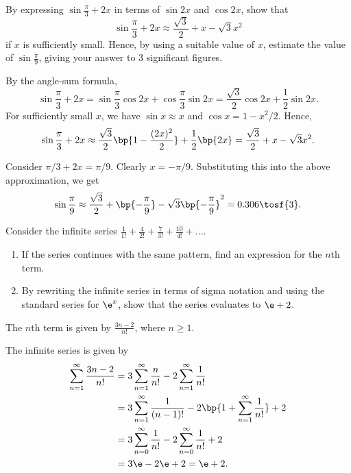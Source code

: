 \begin{problem}
    By expressing $\sin{\frac\pi3 + 2x}$ in terms of $\sin2x$ and $\cos2x$, show that \[\sin{\frac\pi3 + 2x} \approx \frac{\sqrt{3}}{2} + x - \sqrt{3}x^2\] if $x$ is sufficiently small. Hence, by using a suitable value of $x$, estimate the value of $\sin\frac{\pi}{9}$, giving your answer to 3 significant figures.
\end{problem}
\begin{solution}
    By the angle-sum formula, \[\sin{\frac\pi3 + 2x} = \sin \frac\pi3 \cos 2x + \cos \frac\pi3 \sin 2x = \frac{\sqrt{3}}2 \cos 2x + \frac12 \sin 2x.\] For sufficiently small $x$, we have $\sin x \approx x$ and $\cos x = 1 - x^2 / 2$. Hence, \[\sin{\frac\pi3 + 2x} \approx \frac{\sqrt3}{2} \bp{1 - \frac{(2x)^2}{2}} + \frac12 \bp{2x} = \frac{\sqrt3}{2} + x - \sqrt3 x^2.\]

    Consider $\pi/3 + 2x = \pi/9$. Clearly $x = -\pi/9$. Substituting this into the above approximation, we get \[\sin \frac\pi9 \approx \frac{\sqrt3}2 + \bp{-\frac\pi9} -\sqrt3 \bp{-\frac\pi9}^2 = 0.306 \tosf{3}.\]
\end{solution}

\begin{problem}[\chili]
    Consider the infinite series $\frac{1}{1!}+\frac{4}{2!}+\frac{7}{3!}+\frac{10}{4!}+\dots$.
    
    \begin{enumerate}
        \item If the series continues with the same pattern, find an expression for the $n$th term.
        \item By rewriting the infinite series in terms of sigma notation and using the standard series for $\e^{x}$, show that the series evaluates to $\e+2$.
    \end{enumerate}
\end{problem}
\begin{solution}
    \begin{ppart}
        The $n$th term is given by $\frac{3n-2}{n!}$, where $n \geq 1$.
    \end{ppart}
    \begin{ppart}
        The infinite series is given by
        \begin{align*}
            \sum_{n = 1}^\infty \frac{3n-2}{n!} &= 3\sum_{n=1}^\infty \frac{n}{n!} - 2\sum_{n=1}^\infty \frac1{n!} \\
            &= 3\sum_{n=1}^\infty \frac{1}{(n-1)!} - 2\bp{1 + \sum_{n=1}^\infty \frac1{n!}} + 2\\
            &= 3\sum_{n = 0}^\infty \frac1{n!} - 2\sum_{n=0}^\infty \frac1{n!} + 2\\
            &= 3\e - 2\e + 2 = \e + 2.
        \end{align*}
    \end{ppart}
\end{solution}


